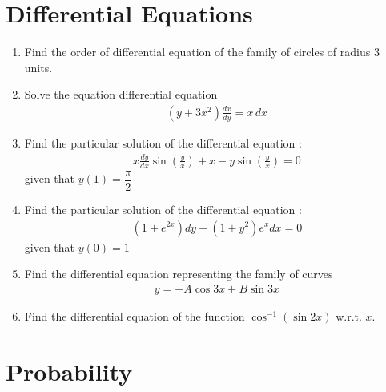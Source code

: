 \documentclass[12pt,-letter paper]{article}
\providecommand{\brak}[1]{\ensuremath{\left(#1\right)}}
\begin{document}
\section{Differential Equations}
\begin{enumerate}

\item Find the order of differential equation of the family of circles of radius $3$ units.

\item Solve the equation differential equation \begin{align*}\brak{y+3x^2}\frac{dx}{dy}=x\,dx \end{align*}

\item Find the particular solution of the differential equation :
	\begin{align*}
             x\frac{dy}{dx}\sin\brak{\frac{y}{x}}+x-y\sin\brak{\frac{y}{x}}=0
        \end{align*} given that $y(1)=\dfrac{\pi}{2}$
        
\item Find the particular solution of the differential equation :
	\begin{align*}
	      \brak{1+e^{2x}}dy+\brak{1+y^2}e^x dx=0
	\end{align*} given that $y(0)=1$

\item Find the differential equation representing the family of curves \begin{align*}y= -A\cos 3x+B\sin 3x\end{align*}

\item Find the differential equation of the function $\cos^{-1}(\sin 2x)$ w.r.t. $x$.

\end{enumerate}

\section{Probability}
\end{document}
